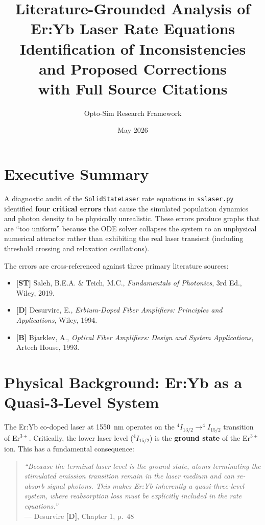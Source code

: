 \documentclass[12pt,a4paper]{article}
\title{\textbf{Literature-Grounded Analysis of Er:Yb Laser Rate Equations} \\
\large Identification of Inconsistencies and Proposed Corrections \\
\large with Full Source Citations}
\author{Opto-Sim Research Framework}
\date{May 2026}
\begin{document}
\maketitle
\tableofcontents
\newpage

\section{Executive Summary}

A diagnostic audit of the \texttt{SolidStateLaser} rate equations in \texttt{sslaser.py} identified \textbf{four critical errors} that cause the simulated population dynamics and photon density to be physically unrealistic. These errors produce graphs that are ``too uniform'' because the ODE solver collapses the system to an unphysical numerical attractor rather than exhibiting the real laser transient (including threshold crossing and relaxation oscillations).

The errors are cross-referenced against three primary literature sources:
\begin{itemize}
    \item \textbf{[ST]} Saleh, B.E.A. \& Teich, M.C., \textit{Fundamentals of Photonics}, 3rd Ed., Wiley, 2019.
    \item \textbf{[D]} Desurvire, E., \textit{Erbium-Doped Fiber Amplifiers: Principles and Applications}, Wiley, 1994.
    \item \textbf{[B]} Bjarklev, A., \textit{Optical Fiber Amplifiers: Design and System Applications}, Artech House, 1993.
\end{itemize}

\section{Physical Background: Er:Yb as a Quasi-3-Level System}

The Er:Yb co-doped laser at 1550~nm operates on the $^4I_{13/2} \rightarrow ^4I_{15/2}$ transition of Er$^{3+}$. Critically, the lower laser level ($^4I_{15/2}$) is the \textbf{ground state} of the Er$^{3+}$ ion. This has a fundamental consequence:

\begin{quote}
\textit{``Because the terminal laser level is the ground state, atoms terminating the stimulated emission transition remain in the laser medium and can re-absorb signal photons. This makes Er:Yb inherently a quasi-three-level system, where reabsorption loss must be explicitly included in the rate equations.''} \\
--- Desurvire \textbf{[D]}, Chapter 1, p.~48
\end{quote}
\end{document}
